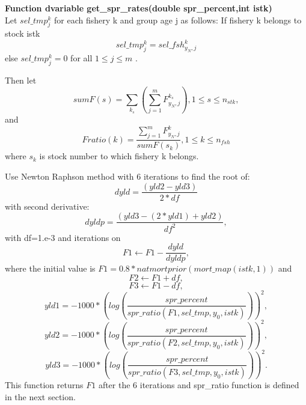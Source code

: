 \documentclass{article}
\begin{document}
\textbf{Function dvariable get\_spr\_rates(double spr\_percent,int istk)}\\

Let $sel\_tmp^k_j$ for each fishery k and group age j as follows:
If fishery k belongs to stock istk
\begin{equation}
sel\_tmp^k_j=sel\_fsh^k_{y_N,j}
\end{equation}
else $sel\_tmp^k_j=0$ for all $1\leq j \leq m$ .

Then let
\begin{equation}
    sumF(s)=\sum_{k_s}\left(\sum_{j=1}^mF^{k_s}_{y_N,j}\right), 1\leq s  \leq n_{stk},
\end{equation}
and
\begin{equation}
    Fratio(k)=\dfrac{\sum_{j=1}^m F^k_{y_N,j}}{sumF(s_k)}, 1 \leq k \leq n_{fsh}
\end{equation}
where $s_k$ is stock number to which fishery k belongs.


Use Newton Raphson method with 6 iterations to find the root of:
\begin{equation}
    dyld=\dfrac{(yld2-yld3)}{2*df}
\end{equation}
with second derivative:
\begin{equation}
    dyldp=\dfrac{(yld3-(2*yld1)+yld2)}{df^2},
\end{equation}
with df=1.e-3 and
iterations on
\begin{equation*}
    F1\leftarrow F1-\dfrac{dyld}{dyldp},
\end{equation*}
where the initial value is $F1=0.8*natmortprior(mort\_map(istk,1))$ and
\begin{equation*}
    F2\leftarrow F1+df,
\end{equation*}
\begin{equation*}
    F3 \leftarrow F1-df,
\end{equation*}
\begin{equation*}
    yld1=-1000*\left(log\left(\dfrac{spr\_percent}{spr\_ratio(F1, sel\_tmp,y_0,istk)}\right)\right)^2,
\end{equation*}
\begin{equation*}
    yld2   = -1000*\left(log\left(\dfrac{spr\_percent}{spr\_ratio(F2, sel\_tmp,y_0,istk)}\right)\right)^2,
\end{equation*}
\begin{equation*}
    yld3= -1000*\left(log\left(\dfrac{spr\_percent}{spr\_ratio(F3, sel\_tmp,y_0,istk)}\right)\right)^2.
\end{equation*}
This function returns $F1$ after the 6 iterations and spr\_ratio function is defined in the next section.
\end{document}
